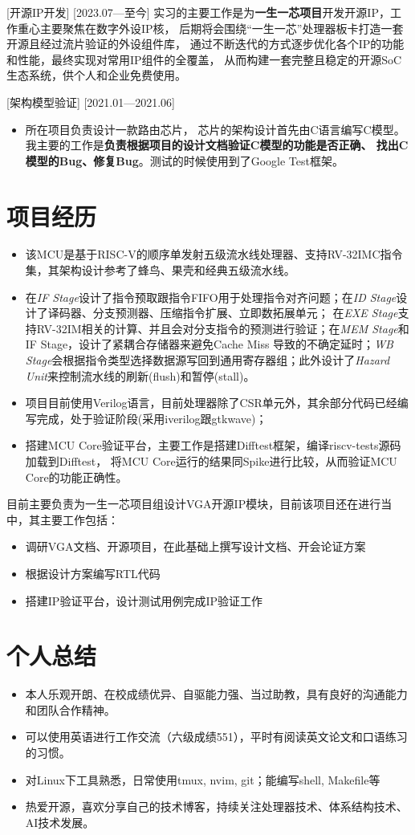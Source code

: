 \documentclass{resume}
\begin{document}
[开源IP开发]
[2023.07—至今] 
实习的主要工作是为\textbf{一生一芯项目}开发开源IP，工作重心主要聚焦在数字外设IP核，
后期将会围绕“一生一芯”处理器板卡打造一套开源且经过流片验证的外设组件库，
通过不断迭代的方式逐步优化各个IP的功能和性能，最终实现对常用IP组件的全覆盖，
从而构建一套完整且稳定的开源SoC生态系统，供个人和企业免费使用。

[架构模型验证]
[2021.01—2021.06] 
\begin{itemize}
  \item 所在项目负责设计一款路由芯片，
      芯片的架构设计首先由C语言编写C模型。
      我主要的工作是\textbf{负责根据项目的设计文档验证C模型的功能是否正确、
      找出C模型的Bug、修复Bug}。测试的时候使用到了Google Test框架。
\end{itemize}

\section{项目经历}
\begin{itemize}
    \item 该MCU是基于RISC-V的顺序单发射五级流水线处理器、支持RV-32IMC指令集，其架构设计参考了蜂鸟、果壳和经典五级流水线。
    \item 在\textit{IF Stage}设计了指令预取跟指令FIFO用于处理指令对齐问题；在\textit{ID Stage}设计了译码器、分支预测器、压缩指令扩展、立即数拓展单元；
        在\textit{EXE Stage}支持RV-32IM相关的计算、并且会对分支指令的预测进行验证；在\textit{MEM Stage}和IF Stage，设计了紧耦合存储器来避免Cache Miss
        导致的不确定延时；\textit{WB Stage}会根据指令类型选择数据源写回到通用寄存器组；此外设计了\textit{Hazard Unit}来控制流水线的刷新(flush)和暂停(stall)。
    \item 项目目前使用Verilog语言，目前处理器除了CSR单元外，其余部分代码已经编写完成，处于验证阶段(采用iverilog跟gtkwave)；
    \item 搭建MCU Core验证平台，主要工作是搭建Difftest框架，编译riscv-tests源码加载到Difftest，
        将MCU Core运行的结果同Spike进行比较，从而验证MCU Core的功能正确性。
\end{itemize}
目前主要负责为一生一芯项目组设计VGA开源IP模块，目前该项目还在进行当中，其主要工作包括：

\begin{itemize}
    \item 调研VGA文档、开源项目，在此基础上撰写设计文档、开会论证方案
    \item 根据设计方案编写RTL代码
    \item 搭建IP验证平台，设计测试用例完成IP验证工作
\end{itemize}

\section{个人总结}
\begin{itemize}
    \item 本人乐观开朗、在校成绩优异、自驱能力强、当过助教，具有良好的沟通能力和团队合作精神。
    \item 可以使用英语进行工作交流（六级成绩551），平时有阅读英文论文和口语练习的习惯。
    \item 对Linux下工具熟悉，日常使用tmux, nvim, git；能编写shell, Makefile等
    \item 热爱开源，喜欢分享自己的技术博客，持续关注处理器技术、体系结构技术、AI技术发展。
\end{itemize}
\end{document}
